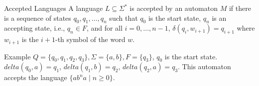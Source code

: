 \documentclass{beamer}
\begin{document}
\begin{frame}{Accepted Languages}
A language $L\subseteq\Sigma^*$ is accepted by an automaton $M$ if there is a sequence of states $q_0,q_1,\ldots,q_n$ such that $q_0$ is the start state, $q_n$ is an accepting state, i.e., $q_n\in F$, and for all $i=0,\ldots,n-1$, $\delta(q_i,w_{i+1})=q_{i+1}$ where $w_{i+1}$ is the $i+1$-th symbol of the word $w$.
\end{frame}

\begin{frame}{Example}
$Q=\{q_0,q_1,q_2,q_3\},\Sigma=\{a,b\},F=\{q_3\}$, $q_0$ is the start state. $delta(q_0,a)=q_1$, $delta(q_1,b)=q_2$, $delta(q_2,a)=q_3$. This automaton accepts the language $\{ab^na\mid n\geq 0\}$.
\end{frame}
\end{document}

